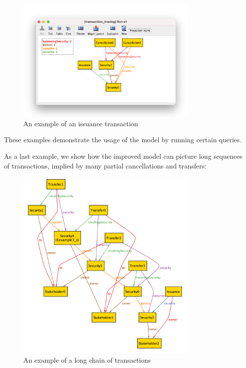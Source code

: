 \begin{figure}[ht]
\centering
\includegraphics[width=0.8\textwidth]{pics/cancellation.png}
\caption{An example of an issuance transaction}
\label{fig:transaction-tracing-for-stocks-example-3}
\end{figure}

These examples demonstrate the usage of the model by running certain queries.

As a last example, we show how the improved model can picture long sequences of transactions, implied by many partial cancellations and transfers:

\begin{figure}
\centering
\includegraphics[width=0.8\textwidth]{pics/long-example.png}
\caption{An example of a long chain of transactions}
\label{fig:transaction-long-chain}
\end{figure}

